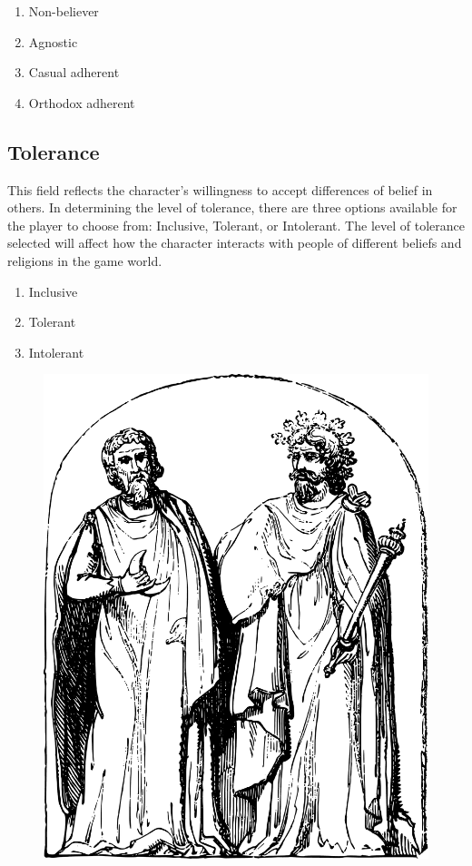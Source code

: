 \documentclass[12pt]{book}  %
\begin{document}
\begin{enumerate}
    \item Non-believer
    \item Agnostic
    \item Casual adherent
    \item Orthodox adherent
\end{enumerate}

\subsection{\textbf{Tolerance}}

This field reflects the character's willingness to accept differences of belief in others. In determining the level of tolerance, there are three options available for the player to choose from: Inclusive, Tolerant, or Intolerant. The level of tolerance selected will affect how the character interacts with people of different beliefs and religions in the game world.

\begin{enumerate}
    \item Inclusive
    \item Tolerant
    \item Intolerant
\end{enumerate}

\begin{figure}[h]
    \centering
    \includegraphics[width=\textwidth]{./images/religion03.pdf}
\end{figure}
\end{document}
